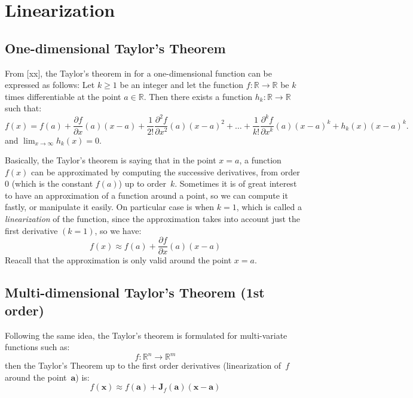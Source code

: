 
\section{Linearization}
\label{sec:Linearization}
\subsection{One-dimensional Taylor's Theorem}
From [xx], the Taylor's theorem in for a one-dimensional function can be expressed as follows: Let $k \ge 1$ be an integer and let the function $f:\mathbb{R} \rightarrow \mathbb{R}$ be $k$ times differentiable at the point $a\in\mathbb{R}$. Then there exists a function $h_k:\mathbb{R} \rightarrow \mathbb{R}$ such that:
\begin{equation}
 f(x) = f(a) + \frac{\partial f }{\partial x}(a)(x-a) + \frac{1}{2!}\frac{\partial^2 f }{\partial x^2}(a)(x-a)^2 + \dots
 + \frac{1}{k!}\frac{\partial^k f }{\partial x^k}(a)(x-a)^k + h_k(x)(x-a)^k.
\end{equation}
and $\lim_{x\to\infty}h_k(x)=0$.

Basically, the Taylor's theorem is saying that in the point $x=a$, a function $f(x)$ can be approximated by computing the successive derivatives, from order~$0$ (which is the constant $f(a)$) up to order~$k$. Sometimes it is of great interest to have an approximation of a function around a point, so we can compute it fastly, or manipulate it easily. On particular case is when $k=1$, which is called a \textit{linearization} of the function, since the approximation takes into account just the first derivative $(k=1)$, so we have:
\begin{equation}
f(x) \approx f(a) + \frac{\partial f }{\partial x}(a)(x-a)
\end{equation}
Reacall that the approximation is only valid around the point $x=a$.

\subsection{Multi-dimensional Taylor's Theorem (1st order)}
Following the same idea, the Taylor's theorem is formulated for multi-variate functions such as:
\begin{equation}
 f:\mathbb{R}^n \rightarrow \mathbb{R}^m
\end{equation}
then the Taylor's Theorem up to the first order derivatives (linearization of~$f$ around the point~$\mathbf{a}$) is:
\begin{equation}
f(\mathbf{x}) \approx f(\mathbf{a}) + \mathbf{J}_f(\mathbf{a})(\mathbf{x}-\mathbf{a})
\end{equation}


